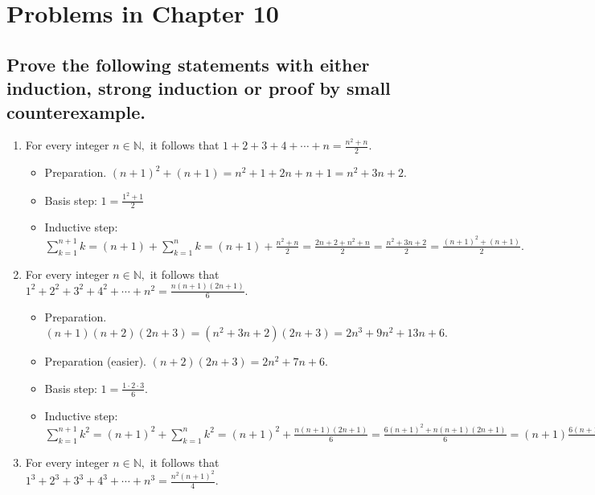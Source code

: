 \documentclass[11pt, oneside]{amsart}
\author{Francisco J. Blanco-Silva}
\date{\today}
\title{}
\begin{document}
\section{Problems in Chapter 10}
\label{sec:org1dc036f}
\subsection{Prove the following statements with either induction, strong induction or proof by small counterexample.}
\label{sec:org6ba4644}
\begin{enumerate}
\item For every integer \(n \in \mathbb{N},\) it follows that \(1+2+3+4+\dotsb +n = \frac{n^2+n}{2}.\)
\label{sec:org2cf41db}
\begin{itemize}
\item Preparation. \((n+1)^2+(n+1) = n^2 + 1 + 2n + n + 1 = n^2+3n+2.\)
\item Basis step: \(1 = \frac{1^2+1}{2}\)
\item Inductive step: \(\sum_{k=1}^{n+1} k = (n+1) + \sum_{k=1}^n k = (n+1) + \frac{n^2+n}{2} =
      \frac{2n+2+n^2+n}{2} = \frac{n^2+3n+2}{2} = \frac{(n+1)^2+(n+1)}{2}.\)
\end{itemize}
\item For every integer \(n \in \mathbb{N},\) it follows that \(1^2 + 2^2 + 3^2 + 4^2 + \dotsb + n^2 = \frac{ n(n+1)(2n+1) }{6}.\)
\label{sec:org93a8054}
\begin{itemize}
\item Preparation. \((n+1)(n+2)(2n+3) = (n^2+3n+2)(2n+3) = 2n^3+9n^2+13n+6.\)
\item Preparation (easier). \((n+2)(2n+3) = 2n^2+7n+6.\)
\item Basis step: \(1 = \frac{1\cdot 2\cdot 3}{6}.\)
\item Inductive step: \(\sum_{k=1}^{n+1} k^2 = (n+1)^2 + \sum_{k=1}^n k^2 = (n+1)^2 + \frac{n(n+1)(2n+1)}{6}
      = \frac{ 6(n+1)^2 + n(n+1)(2n+1)}{6} = (n+1) \frac{ 6(n+1)+ n(2n+1) }{6} = (n+1) \frac{2n^2+7n+6}{6}.\)
\end{itemize}
\item For every integer \(n \in \mathbb{N},\) it follows that \(1^3 + 2^3 + 3^3 + 4^3 + \dotsb + n^3 = \frac{n^2(n+1)^2}{4}.\)
\label{sec:orgfb47b3d}
\end{enumerate}
\end{document}
